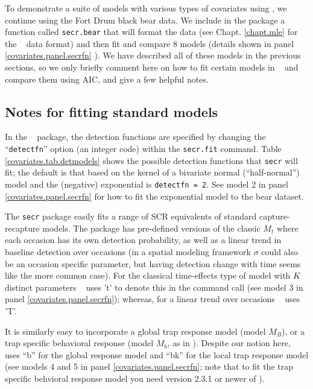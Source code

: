 To demonstrate
a suite of models with various types of covariates using \secr, we
continue using the Fort Drum black bear data. 
We include in the \scrbook package a function called {\tt secr.bear}
that will format the data (see Chapt. \ref{chapt.mle} for the \secr~
data format) and then fit and compare 8 models (details shown in panel
\ref{covariates.panel.secrfn} ).  We have described all of these
models in the previous sections, so we only briefly comment here on
how to fit certain models in \secr~ and compare them using AIC, and
give a few helpful notes.

\subsection{Notes for fitting standard models}

In the \secr~ package, the detection functions are specified
by changing the ``\mbox{\tt detectfn}'' option (an integer code)
within the \mbox{\tt secr.fit} command.  Table
\ref{covariates.tab.detmodels} shows the possible detection functions
that \mbox{\tt secr} will fit; the default is that based on the kernel
of a bivariate normal
(``half-normal'') model and the
(negative) exponential is \mbox{\tt detectfn = 2}.  See model 2 in 
panel \ref{covariates.panel.secrfn} for how to fit the exponential 
model to the bear dataset. 

The \mbox{\tt secr} package easily fits a range of SCR equivalents of standard capture-recapture models.
The package has pre-defined versions of the classic
$M_{t}$ where each
occasion has its own detection probability, as well as a linear
trend in baseline detection over occasions (in a spatial modeling framework $\sigma$ could also be an occasion specific parameter, but having detection change with time seems like the more common case). For the classical
time-effects type of model with $K$ distinct parameters \secr~ uses 't' to denote
this in the command call (see model 3 in 
panel \ref{covariates.panel.secrfn}); whereas, for a linear
trend over occasions \secr~ uses 'T'.

It is similarly easy to incorporate a global trap response model (model $M_{B}$), 
or a trap specific behavioral response (model $M_{b}$, as in
\citet{royle_etal:2009}). Despite our notion here, \secr~ uses ``b'' for the global response model and
 ``bk'' for the local trap response model
(see models 4 and 5 in 
panel \ref{covariates.panel.secrfn}; note that to fit the trap specific behvioral response model you need version 2.3.1 or newer of \secr).

